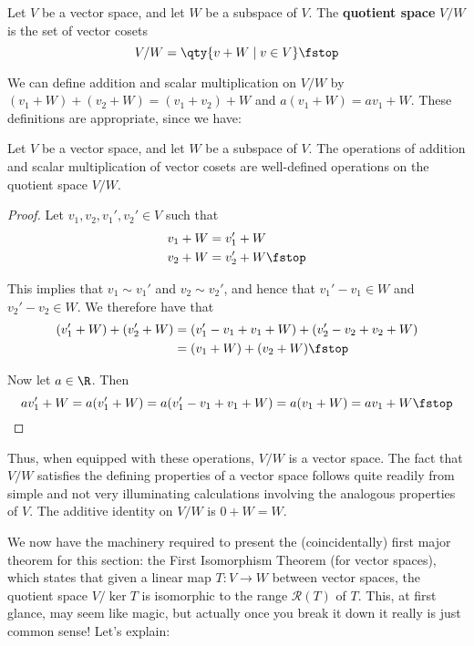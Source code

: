  \begin{definition}
   Let \( V \) be a vector space, and let \( W \) be a subspace of \( V \). The \textbf{quotient space} \( V/W \) is the set of vector cosets
   \[ V/W=\qty{v+W\mid v\in V}\fstop \]
 \end{definition}

 We can define addition and scalar multiplication on \( V/W \) by \( (v_1+W)+(v_2+W)=(v_1+v_2)+W \) and \( a(v_1+W)=av_1+W \). These definitions are appropriate, since we have:
  \begin{proposition}
   Let \( V \) be a vector space, and let \( W \) be a subspace of \( V \). The operations of addition and scalar multiplication of vector cosets are well-defined operations on the quotient space \( V/W \).
 \end{proposition}
 \begin{proof}
   Let \( v_1,v_2,v_1',v_2'\in V \) such that
   \begin{align*}
     v_1+W&= v_1'+W\\
     v_2+W&= v_2'+W\fstop
   \end{align*}

   This implies that \( v_1\sim v_1' \) and \( v_2\sim v_2' \), and hence that \( v_1'-v_1\in W \) and \( v_2'-v_2\in W \). We therefore have that
   \begin{align*}
     (v_1'+W)+(v_2'+W)&= (v_1'-v_1+v_1+W)+(v_2'-v_2+v_2+W)\\
     &= (v_1+W)+(v_2+W)\fstop
   \end{align*}

   Now let \( a\in\R \). Then
   \[ av_1'+W=a(v_1'+W)=a(v_1'-v_1+v_1+W)=a(v_1+W)=av_1+W\fstop \]
 \end{proof}

 Thus, when equipped with these operations, \( V/W \) is a vector space. The fact that \( V/W \) satisfies the defining properties of a vector space follows quite readily from simple and not very illuminating calculations involving the analogous properties of \( V \). The additive identity on \( V/W \) is \( 0+W=W \).

 \vspace{3mm}

 We now have the machinery required to present the (coincidentally) first major theorem for this section: the First Isomorphism Theorem (for vector spaces), which states that given a linear map \( T:V\to W \) between vector spaces, the quotient space \( V/\ker T \) is isomorphic to the range \( \mathcal{R}(T) \) of \( T \). This, at first glance, may seem like magic, but actually once you break it down it really is just common sense! Let's explain:

